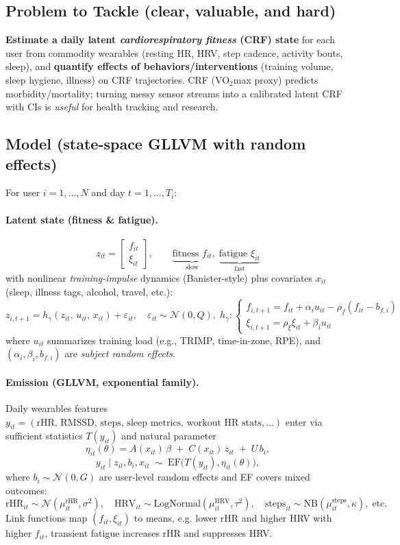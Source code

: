 \subsection*{Problem to Tackle (clear, valuable, and hard)}
\textbf{Estimate a daily latent \emph{cardiorespiratory fitness} (CRF) state} for each user from commodity wearables (resting HR, HRV, step cadence, activity bouts, sleep), and \textbf{quantify effects of behaviors/interventions} (training volume, sleep hygiene, illness) on CRF trajectories. 
CRF (VO\(_2\)max proxy) predicts morbidity/mortality; turning messy sensor streams into a calibrated latent CRF with CIs is \emph{useful} for health tracking and research.

\subsection*{Model (state-space GLLVM with random effects)}
For user \(i=1,\dots,N\) and day \(t=1,\dots,T_i\):

\paragraph{Latent state (fitness \& fatigue).}
\[
z_{it}=\begin{bmatrix} f_{it}\\\xi_{it}\end{bmatrix},\qquad
\underbrace{\text{fitness }f_{it}}_{\text{slow}},\;
\underbrace{\text{fatigue } \xi_{it}}_{\text{fast}}
\]
with nonlinear \emph{training-impulse} dynamics (Banister-style) plus covariates \(x_{it}\) (sleep, illness tags, alcohol, travel, etc.):
\[
z_{i,t+1}
= h_\gamma\!\left(z_{it},\,u_{it},\,x_{it}\right) + \varepsilon_{it},\quad 
\varepsilon_{it}\sim \mathcal N(0,Q),\;
h_\gamma:
\begin{cases}
f_{i,t+1}= f_{it} + \alpha_i u_{it} - \rho_f (f_{it}-b_{f,i})\\[0.2em]
\xi_{i,t+1}= \rho_\xi \xi_{it} + \beta_i u_{it}
\end{cases}
\]
where \(u_{it}\) summarizes training load (e.g., TRIMP, time-in-zone, RPE), and \((\alpha_i,\beta_i,b_{f,i})\) are \emph{subject random effects}.

\paragraph{Emission (GLLVM, exponential family).}
Daily wearables features \(y_{it}=(\text{rHR},\,\text{RMSSD},\,\text{steps},\,\text{sleep metrics},\,\text{workout HR stats},\ldots)\) enter via sufficient statistics \(T(y_{it})\) and natural parameter
\[
\eta_{it}(\theta)= A(x_{it})\,\beta \;+\; C(x_{it})\, z_{it}\;+\; U\,b_i,
\]
\[
y_{it}\mid z_{it},b_i,x_{it}\;\sim\;\text{EF}\!\bigl(T(y_{it}),\eta_{it}(\theta)\bigr),
\]
where \(b_i\sim\mathcal N(0,G)\) are user-level random effects and EF covers mixed outcomes:
\[
\text{rHR}_{it}\sim \mathcal N(\mu_{it}^{\text{rHR}},\sigma^2),\quad
\text{HRV}_{it}\sim \text{LogNormal}(\mu_{it}^{\text{HRV}},\tau^2),\quad
\text{steps}_{it}\sim \text{NB}(\mu_{it}^{\text{steps}},\kappa),\;\text{etc.}
\]
Link functions map \((f_{it},\xi_{it})\) to means, e.g. lower rHR and higher HRV with higher \(f_{it}\), transient fatigue increases rHR and suppresses HRV.

